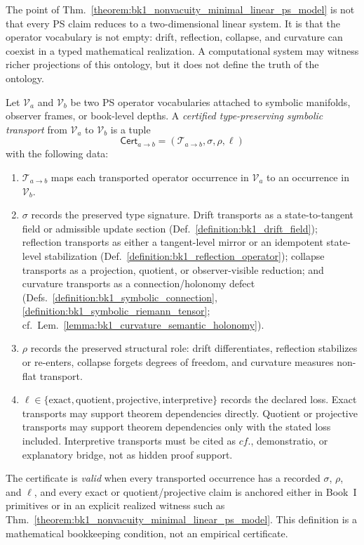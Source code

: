 \begin{remark}
\label{remark:bk1_mathematical_witness_boundary}
The point of Thm.~\ref{theorem:bk1_nonvacuity_minimal_linear_ps_model} is not
that every PS claim reduces to a two-dimensional linear system.  It is that the
operator vocabulary is not empty: drift, reflection, collapse, and curvature can
coexist in a typed mathematical realization.  A computational system may
witness richer projections of this ontology, but it does not define the truth
of the ontology.
\end{remark}

\begin{definition}
\label{definition:bk1_certified_type_preserving_symbolic_transport}
Let \(\mathcal{V}_a\) and \(\mathcal{V}_b\) be two PS operator vocabularies
attached to symbolic manifolds, observer frames, or book-level depths.  A
\emph{certified type-preserving symbolic transport} from \(\mathcal{V}_a\) to
\(\mathcal{V}_b\) is a tuple
\[
\mathsf{Cert}_{a\to b}=(\mathcal{T}_{a\to b},\sigma,\rho,\ell)
\]
with the following data:
\begin{enumerate}
    \item \(\mathcal{T}_{a\to b}\) maps each transported operator occurrence in
    \(\mathcal{V}_a\) to an occurrence in \(\mathcal{V}_b\).
    \item \(\sigma\) records the preserved type signature.  Drift transports as
    a state-to-tangent field or admissible update section
    (Def.~\ref{definition:bk1_drift_field}); reflection transports as either a
    tangent-level mirror or an idempotent state-level stabilization
    (Def.~\ref{definition:bk1_reflection_operator}); collapse transports as a
    projection, quotient, or observer-visible reduction; and curvature
    transports as a connection/holonomy defect
    (Defs.~\ref{definition:bk1_symbolic_connection},
    \ref{definition:bk1_symbolic_riemann_tensor};
    cf.~Lem.~\ref{lemma:bk1_curvature_semantic_holonomy}).
    \item \(\rho\) records the preserved structural role: drift differentiates,
    reflection stabilizes or re-enters, collapse forgets degrees of freedom, and
    curvature measures non-flat transport.
    \item \(\ell\in\{\mathrm{exact},\mathrm{quotient},\mathrm{projective},
    \mathrm{interpretive}\}\) records the declared loss.  Exact transports may
    support theorem dependencies directly.  Quotient or projective transports
    may support theorem dependencies only with the stated loss included.
    Interpretive transports must be cited as \(cf.\), demonstratio, or
    explanatory bridge, not as hidden proof support.
\end{enumerate}
The certificate is \emph{valid} when every transported occurrence has a recorded
\(\sigma\), \(\rho\), and \(\ell\), and every exact or quotient/projective claim
is anchored either in Book~I primitives or in an explicit realized witness such
as Thm.~\ref{theorem:bk1_nonvacuity_minimal_linear_ps_model}.  This definition
is a mathematical bookkeeping condition, not an empirical certificate.
\end{definition}

